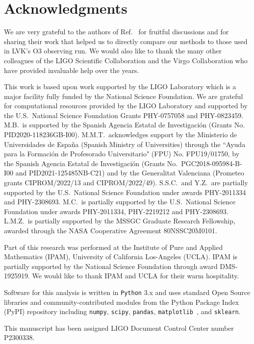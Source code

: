 \section*{Acknowledgments}

We are very grateful to the authors of Ref.~\cite{Chatterjee:2019avs} for fruitful discussions and for sharing their work that helped us to directly compare
our methods to those used in \ac{LVK}'s \ac{O3} observing run. We would also like to thank the many other colleagues of the LIGO Scientific Collaboration and
the Virgo Collaboration who have provided invaluable help over the years.

This work is based upon work supported by the LIGO Laboratory which is a major facility fully funded by the National Science Foundation. We are grateful for computational resources provided
by the LIGO Laboratory and supported by the U.S.\ National Science Foundation Grants PHY-0757058 and PHY-0823459. M.B.\ is supported by the Spanish Agencia Estatal de Investigaci\'on (Grants
No. PID2020-118236GB-I00). M.M.T.\ acknowledges support by the Ministerio de Universidades de Espa\~na (Spanish Ministry of Universities) through the ``Ayuda para la Formaci\'on de
Profesorado Universitario" (FPU) No. FPU19/01750, by the Spanish Agencia Estatal de Investigaci\'on (Grants No.\ PGC2018-095984-B-I00 and PID2021-125485NB-C21) and by the Generalitat
Valenciana (Prometeo grants CIPROM/2022/13 and CIPROM/2022/49). S.S.C.\ and Y.Z.\ are partially supported by the U.S.\ National Science Foundation under awards PHY-2011334 and PHY-2308693.
M.C.\ is partially supported by the U.S.\ National Science Foundation under awards PHY-2011334, PHY-2219212 and PHY-2308693. L.M.Z.\ is partially supported by the MSSGC Graduate Research
Fellowship, awarded through the NASA Cooperative Agreement 80NSSC20M0101.

 Part of this research was performed at the Institute of Pure and Applied Mathematics (IPAM),  University of California Los-Angeles (UCLA). IPAM is partially supported by the National Science
Foundation through award DMS-1925919. We would like to thank IPAM and UCLA for their warm hospitality. 

Software for this analysis is written in \texttt{Python} 3.x  and uses standard Open Source libraries and community-contributed modules from the Python Package Index (PyPI) repository  including \texttt{numpy}, \texttt{scipy}, \texttt{pandas}, \texttt{matplotlib}~\cite{Hunter:2007ouj}, and \texttt{sklearn}.

This manuscript has been assigned LIGO Document Control Center number P2300338.





